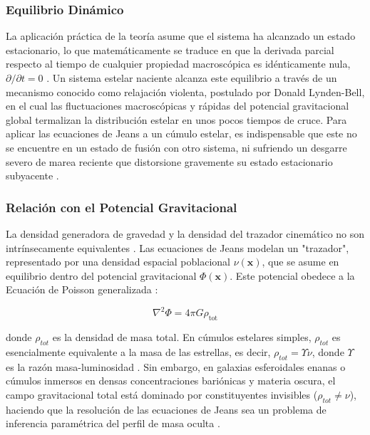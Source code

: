             \subsubsection{Equilibrio Dinámico}
                La aplicación práctica de la teoría asume que el sistema ha 
                alcanzado un estado estacionario, lo que matemáticamente se 
                traduce en que la derivada parcial respecto al tiempo de 
                cualquier propiedad macroscópica es idénticamente nula, 
                $\partial / \partial t = 0$ \newline 
                \cite{binney_tremaine_2008}. Un sistema estelar naciente alcanza 
                este equilibrio a través de un mecanismo conocido como 
                relajación violenta, postulado por Donald Lynden-Bell, en el 
                cual las fluctuaciones macroscópicas y rápidas del potencial 
                gravitacional global termalizan la distribución estelar en unos 
                pocos tiempos de cruce. Para aplicar las ecuaciones de Jeans a 
                un cúmulo estelar, es indispensable que este no se encuentre en 
                un estado de fusión con otro sistema, ni sufriendo un desgarre 
                severo de marea reciente que distorsione gravemente su estado 
                estacionario subyacente \cite{mamon2010kinematic}.

            \subsubsection{Relación con el Potencial Gravitacional}
                La densidad generadora de gravedad y la densidad del trazador 
                cinemático no son intrínsecamente equivalentes 
                \cite{mamon2010kinematic}. Las ecuaciones de Jeans modelan un 
                "trazador", representado por una densidad espacial poblacional 
                $\nu(\mathbf{x})$, que se asume en equilibrio dentro del 
                potencial gravitacional $\Phi(\mathbf{x})$. Este potencial 
                obedece a la Ecuación de Poisson generalizada 
                \cite{binney_tremaine_2008}:

                $$\nabla^2 \Phi = 4\pi G \rho_\text{tot}$$

                donde $\rho_{tot}$ es la densidad de masa total. En cúmulos 
                estelares simples, $\rho_{tot}$ es esencialmente equivalente a 
                la masa de las estrellas, es decir, $\rho_{tot} = \Upsilon \nu$, 
                donde $\Upsilon$ es la razón masa-luminosidad 
                \cite{wolf_etal_2010}. Sin embargo, en galaxias esferoidales 
                enanas o cúmulos inmersos en densas concentraciones bariónicas y 
                materia oscura, el campo gravitacional total está dominado por 
                constituyentes invisibles ($\rho_{tot} \neq \nu$), haciendo que 
                la resolución de las ecuaciones de Jeans sea un problema de 
                inferencia paramétrica del perfil de masa oculta 
                \cite{walker2007velocity}.


